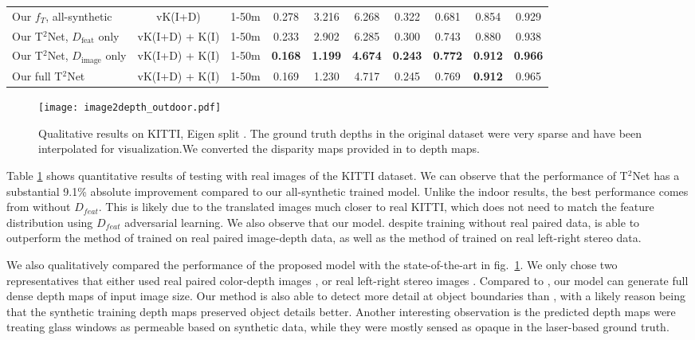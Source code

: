 \documentclass[runningheads]{llncs}
\begin{document}
\begin{table}[tb!]
\begin{center}
\begin{tabular}{|l|c|c|c|c|c|c|c|c|c|}
			Our $f_T$, all-synthetic  & vK(I+D) & 1-50m & 0.278 & 3.216 & 6.268 & 0.322 & 0.681 & 0.854 & 0.929\\
			\rowcolor[rgb]{0.9,0.9,0.9}
			Our T$^2$Net, $D_\text{feat}$ only & vK(I+D) + K(I) & 1-50m &  0.233 & 2.902 & 6.285 & 0.300 & 0.743 & 0.880 & 0.938\\
			\rowcolor[rgb]{0.9,0.9,0.9}
			Our T$^2$Net, $D_\text{image}$ only&  vK(I+D) + K(I) & 1-50m & {\bf 0.168} & {\bf 1.199} & {\bf 4.674} & {\bf 0.243} & {\bf 0.772} & {\bf 0.912} & {\bf 0.966}\\
			\rowcolor[rgb]{0.9,0.9,0.9}
			Our full T$^2$Net &vK(I+D) + K(I) & 1-50m & 0.169 & 1.230 & 4.717& 0.245 & 0.769 &    {\bf 0.912} &   0.965  \\
			\hline
		\end{tabular}
		\label{table:outdoor}
	\end{center}
\end{table}

\begin{figure}[tb!]
	\centering
	\texttt{[image: image2depth\_outdoor.pdf]}
	\caption{Qualitative results on KITTI, Eigen split \cite{eigen2014depth}. The ground truth depths in the original dataset were very sparse and have been interpolated for visualization.We converted the disparity maps provided in \cite{godard2017unsupervised} to depth maps.}
	\label{fig:depth_outdoor}
\end{figure}

Table \ref{table:outdoor} shows quantitative results of testing with real images of the KITTI dataset. We can observe that the performance of T$^2$Net has a substantial 9.1\% absolute improvement compared to our all-synthetic trained model. Unlike the indoor results, the best performance comes from without $D_{feat}$. This is likely due to the translated images much closer to real KITTI, which does not need to match the feature distribution using $D_{feat}$ adversarial learning. We also observe that our model. despite training without real paired data, is able to outperform the method of \cite{eigen2014depth} trained on real paired image-depth data, as well as the method of  \cite{garg2016unsupervised} trained on real left-right stereo data.

We also qualitatively compared the performance of the proposed model with the state-of-the-art in fig.~\ref{fig:depth_outdoor}. We only chose two representatives that either used real paired color-depth images \cite{eigen2014depth}, or real left-right stereo images \cite{godard2017unsupervised}. Compared to \cite{eigen2014depth}, our model can generate full dense depth maps of input image size. Our method is also able to detect more detail at object boundaries than \cite{godard2017unsupervised}, with a likely reason being that the synthetic training depth maps preserved object details better. Another interesting observation is the predicted depth maps were treating glass windows as permeable based on synthetic data, while they were mostly sensed as opaque in the laser-based ground truth.
\end{document}
